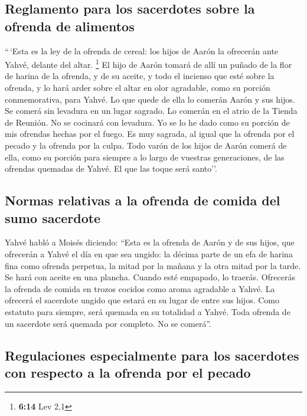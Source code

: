 \hypertarget{reglamento-para-los-sacerdotes-sobre-la-ofrenda-de-alimentos}{%
\subsection{Reglamento para los sacerdotes sobre la ofrenda de
alimentos}\label{reglamento-para-los-sacerdotes-sobre-la-ofrenda-de-alimentos}}

 ``\,`Esta es la ley de la ofrenda de cereal: los hijos
de Aarón la ofrecerán ante Yahvé, delante del altar. \footnote{\textbf{6:14}
  Lev 2,1}  El hijo de Aarón tomará de allí un puñado de
la flor de harina de la ofrenda, y de su aceite, y todo el incienso que
esté sobre la ofrenda, y lo hará arder sobre el altar en olor agradable,
como su porción conmemorativa, para Yahvé.  Lo que quede
de ella lo comerán Aarón y sus hijos. Se comerá sin levadura en un lugar
sagrado. Lo comerán en el atrio de la Tienda de Reunión. 
No se cocinará con levadura. Yo se lo he dado como su porción de mis
ofrendas hechas por el fuego. Es muy sagrada, al igual que la ofrenda
por el pecado y la ofrenda por la culpa.  Todo varón de
los hijos de Aarón comerá de ella, como su porción para siempre a lo
largo de vuestras generaciones, de las ofrendas quemadas de Yahvé. El
que las toque será santo''.

\hypertarget{normas-relativas-a-la-ofrenda-de-comida-del-sumo-sacerdote}{%
\subsection{Normas relativas a la ofrenda de comida del sumo
sacerdote}\label{normas-relativas-a-la-ofrenda-de-comida-del-sumo-sacerdote}}

 Yahvé habló a Moisés diciendo:  ``Esta es
la ofrenda de Aarón y de sus hijos, que ofrecerán a Yahvé el día en que
sea ungido: la décima parte de un efa de harina fina como ofrenda
perpetua, la mitad por la mañana y la otra mitad por la tarde.
 Se hará con aceite en una plancha. Cuando esté empapado,
lo traerás. Ofrecerás la ofrenda de comida en trozos cocidos como aroma
agradable a Yahvé.  La ofrecerá el sacerdote ungido que
estará en su lugar de entre sus hijos. Como estatuto para siempre, será
quemada en su totalidad a Yahvé.  Toda ofrenda de un
sacerdote será quemada por completo. No se comerá''.

\hypertarget{regulaciones-especialmente-para-los-sacerdotes-con-respecto-a-la-ofrenda-por-el-pecado}{%
\subsection{Regulaciones especialmente para los sacerdotes con respecto
a la ofrenda por el
pecado}\label{regulaciones-especialmente-para-los-sacerdotes-con-respecto-a-la-ofrenda-por-el-pecado}}

